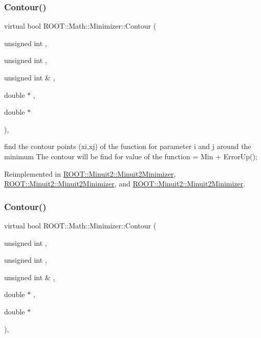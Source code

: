 \mbox{\label{classROOT_1_1Math_1_1Minimizer_aeb8855190ff2e37911c38ed839f2043c}} 
\subsubsection{\texorpdfstring{Contour()}{Contour()}\hspace{0.1cm}{\footnotesize\ttfamily [2/3]}}
{\footnotesize\ttfamily virtual bool R\+O\+O\+T\+::\+Math\+::\+Minimizer\+::\+Contour (\begin{DoxyParamCaption}\item[{unsigned int}]{,  }\item[{unsigned int}]{,  }\item[{unsigned int \&}]{,  }\item[{double $\ast$}]{,  }\item[{double $\ast$}]{ }\end{DoxyParamCaption})\hspace{0.3cm}{\ttfamily [inline]}, {\ttfamily [virtual]}}

find the contour points (xi,xj) of the function for parameter i and j around the minimum The contour will be find for value of the function = Min + Error\+Up(); 

Reimplemented in \mbox{\hyperlink{classROOT_1_1Minuit2_1_1Minuit2Minimizer_a026780c27dd4b179817f826f49e36c8e}{R\+O\+O\+T\+::\+Minuit2\+::\+Minuit2\+Minimizer}}, \mbox{\hyperlink{classROOT_1_1Minuit2_1_1Minuit2Minimizer_a026780c27dd4b179817f826f49e36c8e}{R\+O\+O\+T\+::\+Minuit2\+::\+Minuit2\+Minimizer}}, and \mbox{\hyperlink{classROOT_1_1Minuit2_1_1Minuit2Minimizer_a026780c27dd4b179817f826f49e36c8e}{R\+O\+O\+T\+::\+Minuit2\+::\+Minuit2\+Minimizer}}.

\mbox{\label{classROOT_1_1Math_1_1Minimizer_aeb8855190ff2e37911c38ed839f2043c}} 
\subsubsection{\texorpdfstring{Contour()}{Contour()}\hspace{0.1cm}{\footnotesize\ttfamily [3/3]}}
{\footnotesize\ttfamily virtual bool R\+O\+O\+T\+::\+Math\+::\+Minimizer\+::\+Contour (\begin{DoxyParamCaption}\item[{unsigned int}]{,  }\item[{unsigned int}]{,  }\item[{unsigned int \&}]{,  }\item[{double $\ast$}]{,  }\item[{double $\ast$}]{ }\end{DoxyParamCaption})\hspace{0.3cm}{\ttfamily [inline]}, {\ttfamily [virtual]}}

